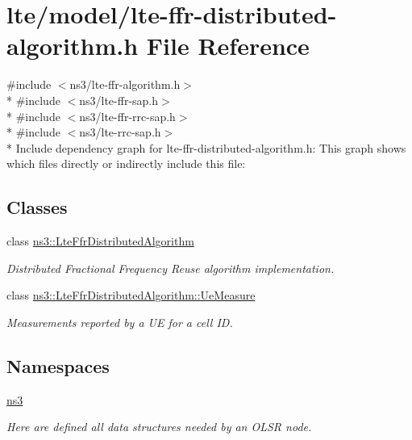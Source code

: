 \hypertarget{lte-ffr-distributed-algorithm_8h}{}\section{lte/model/lte-\/ffr-\/distributed-\/algorithm.h File Reference}
\label{lte-ffr-distributed-algorithm_8h}
{\ttfamily \#include $<$ns3/lte-\/ffr-\/algorithm.\+h$>$}\\*
{\ttfamily \#include $<$ns3/lte-\/ffr-\/sap.\+h$>$}\\*
{\ttfamily \#include $<$ns3/lte-\/ffr-\/rrc-\/sap.\+h$>$}\\*
{\ttfamily \#include $<$ns3/lte-\/rrc-\/sap.\+h$>$}\\*
Include dependency graph for lte-\/ffr-\/distributed-\/algorithm.h\+:
This graph shows which files directly or indirectly include this file\+:
\subsection*{Classes}
\begin{DoxyCompactItemize}
\item 
class \hyperlink{classns3_1_1LteFfrDistributedAlgorithm}{ns3\+::\+Lte\+Ffr\+Distributed\+Algorithm}
\begin{DoxyCompactList}\small\item\em Distributed Fractional Frequency Reuse algorithm implementation. \end{DoxyCompactList}\item 
class \hyperlink{classns3_1_1LteFfrDistributedAlgorithm_1_1UeMeasure}{ns3\+::\+Lte\+Ffr\+Distributed\+Algorithm\+::\+Ue\+Measure}
\begin{DoxyCompactList}\small\item\em Measurements reported by a UE for a cell ID. \end{DoxyCompactList}\end{DoxyCompactItemize}
\subsection*{Namespaces}
\begin{DoxyCompactItemize}
\item 
 \hyperlink{namespacens3}{ns3}
\begin{DoxyCompactList}\small\item\em Here are defined all data structures needed by an O\+L\+SR node. \end{DoxyCompactList}\end{DoxyCompactItemize}
